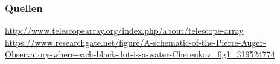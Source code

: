\documentclass[aspectratio=1610, 9pt]{beamer}
\begin{document}
\begin{frame}\frametitle{Quellen}
\url{http://www.telescopearray.org/index.php/about/telescope-array} \\
\url{https://www.researchgate.net/figure/A-schematic-of-the-Pierre-Auger-Observatory-where-each-black-dot-is-a-water-Cherenkov_fig1_319524774} \\
\end{frame}
\end{document}

